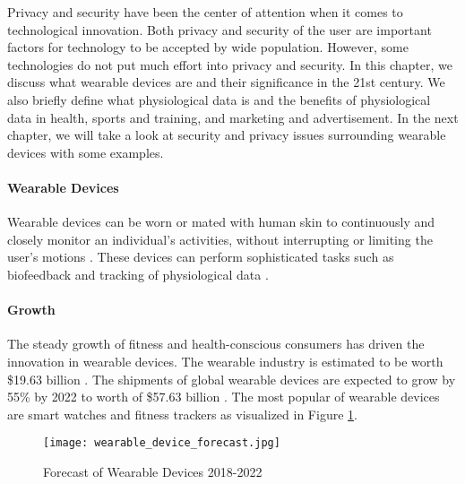 \label{chapter:introduction}
Privacy and security have been the center of attention when it comes to technological innovation. Both privacy and security of the user are important factors for technology to be accepted by wide population. However, some technologies do not put much effort into privacy and security. In this chapter, we discuss what wearable devices are and their significance in the 21st century. We also briefly define what physiological data is and the benefits of physiological data in health, sports and training, and marketing and advertisement. In the next chapter, we will take a look at security and privacy issues surrounding wearable devices with some examples. 

\paragraph{Wearable Devices}
Wearable devices can be worn or mated with human skin to continuously and closely monitor an individual’s activities, without interrupting or limiting the user’s motions \cite{gao_fully_2016}. These devices can perform sophisticated tasks such as biofeedback and tracking of physiological data \cite{noauthor_wearable_nodate}.

\paragraph{Growth} The steady growth of fitness and health-conscious consumers has driven the innovation in wearable devices. The wearable industry is estimated to be worth \$19.63 billion \cite{noauthor_wearable_market_nodate}. The shipments of global wearable devices are expected to grow by 55\% by 2022 \cite{WearableStudy} to worth of \$57.63 billion \cite{noauthor_wearable_market_nodate}. The most popular of wearable devices are smart watches and fitness trackers as visualized in Figure \ref{fig:forecast_of_wearable_devices}.

\begin{figure}
    \centering
    \texttt{[image: wearable\_device\_forecast.jpg]}
    \caption{Forecast of Wearable Devices 2018-2022 \cite{WearableStudy}}
    \label{fig:forecast_of_wearable_devices}
\end{figure}


